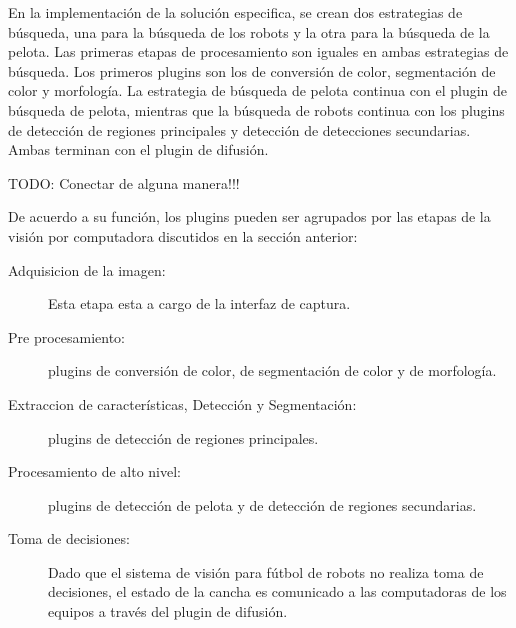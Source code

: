 En la implementación de la solución especifica, se crean dos estrategias de
búsqueda, una para la búsqueda de los robots y la otra para la búsqueda de la
pelota. Las primeras etapas de procesamiento son iguales en ambas estrategias de
búsqueda. Los primeros plugins son los de conversión de color, segmentación de
color y morfología. La estrategia de búsqueda de pelota continua con el plugin
de búsqueda de pelota, mientras que la búsqueda de robots continua con los
plugins de detección de regiones principales y detección de detecciones
secundarias. Ambas terminan con el plugin de difusión.

TODO: Conectar de alguna manera!!!

De acuerdo a su función, los plugins pueden ser agrupados por las etapas de la
visión por computadora discutidos en la sección anterior:

\begin{description}

\item[Adquisicion de la imagen:] Esta etapa esta a cargo de la interfaz de
	captura.

\item[Pre procesamiento:] plugins de conversión de color, de segmentación de
	color y de morfología.

\item[Extraccion de características, Detección y Segmentación:] plugins de
	detección de regiones principales.

\item[Procesamiento de alto nivel:] plugins de detección de pelota y de
	detección de regiones secundarias.

\item[Toma de decisiones:] Dado que el sistema de visión para fútbol de robots
	no realiza toma de decisiones, el estado de la cancha es comunicado a
	las computadoras de los equipos a través del plugin de difusión.

\end{description}
